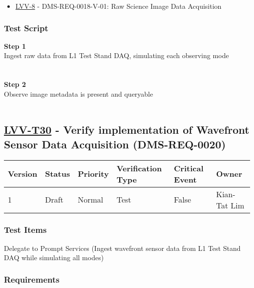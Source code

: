 \begin{itemize}
\tightlist
\item
  \href{https://jira.lsstcorp.org/browse/LVV-8}{LVV-8} -
  DMS-REQ-0018-V-01: Raw Science Image Data Acquisition
\end{itemize}

\hypertarget{test-script-6}{%
\subsubsection{Test Script}\label{test-script-6}}

\textbf{Step 1}\\
{Ingest raw data from L1 Test Stand DAQ, simulating each observing
mode\\
}~\\
~\\
\textbf{Step 2}\\
O{bserve image metadata is present and queryable}\\
~\\

\hypertarget{lvv-t30---verify-implementation-of-wavefront-sensor-data-acquisition-dms-req-0020}{%
\subsection{\texorpdfstring{\href{https://jira.lsstcorp.org/secure/Tests.jspa\#/testCase/LVV-T30}{LVV-T30}
- Verify implementation of Wavefront Sensor Data Acquisition
(DMS-REQ-0020)}{LVV-T30 - Verify implementation of Wavefront Sensor Data Acquisition (DMS-REQ-0020)}}\label{lvv-t30---verify-implementation-of-wavefront-sensor-data-acquisition-dms-req-0020}}

\begin{longtable}[]{@{}llllll@{}}
\toprule
Version & Status & Priority & Verification Type & Critical Event &
Owner\tabularnewline
\midrule
\endhead
1 & Draft & Normal & Test & False & Kian-Tat Lim\tabularnewline
\bottomrule
\end{longtable}

\hypertarget{test-items-6}{%
\subsubsection{Test Items}\label{test-items-6}}

Delegate to Prompt Services (Ingest wavefront sensor data from L1 Test
Stand DAQ while simulating all modes)

\hypertarget{requirements-7}{%
\subsubsection{Requirements}\label{requirements-7}}

